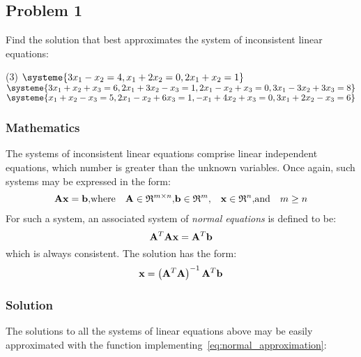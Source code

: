 \subsection{Problem 1}%
\label{sec:problem_1}
Find the solution that best approximates the system of inconsistent linear equations:
\begin{tasks}(3)
  \task $\systeme{3x_1-x_2=4,x_1+2x_2=0,2x_1+x_2=1}$
  \task $\systeme{3x_1+x_2+x_3=6,
  2x_1+3x_2-x_3=1,
  2x_1-x_2+x_3=0,
  3x_1-3x_2+3x_3=8}$
  \task $\systeme{x_1+x_2-x_3=5,
  2x_1-x_2+6x_3=1,
  -x_1+4x_2+x_3=0,
  3x_1+2x_2-x_3=6}$
\end{tasks}
\subsubsection*{Mathematics}
The systems of inconsistent linear equations comprise linear independent equations,
which number is greater than the unknown variables.
Once again, such systems may be expressed in the form:
\begin{align*}
  \mathbf{Ax}=\mathbf{b}, & \text{where} &
  \mathbf{A}\in\mathfrak{R}^{m\times{}n}, &
  \mathbf{b}\in\mathfrak{R}^m, &
  \mathbf{x}\in\mathfrak{R}^n, & \text{and} & m\geq{}n
\end{align*}
For such a system, an associated system of \textit{normal equations} is defined to be:
\begin{equation}
  \label{eq:normal_approximation}
  \mathbf{A}^T\mathbf{Ax}=\mathbf{A}^T\mathbf{b}
\end{equation}
which is always consistent.
The solution has the form:
\begin{equation}
  \mathbf{x}=\left(\mathbf{A}^T\mathbf{A}\right)^{-1}\mathbf{A}^T\mathbf{b}
\end{equation}
\subsubsection*{Solution}
The solutions to all the systems of linear equations above may be easily approximated
with the \MATLAB{} function implementing~\eqref{eq:normal_approximation}:

